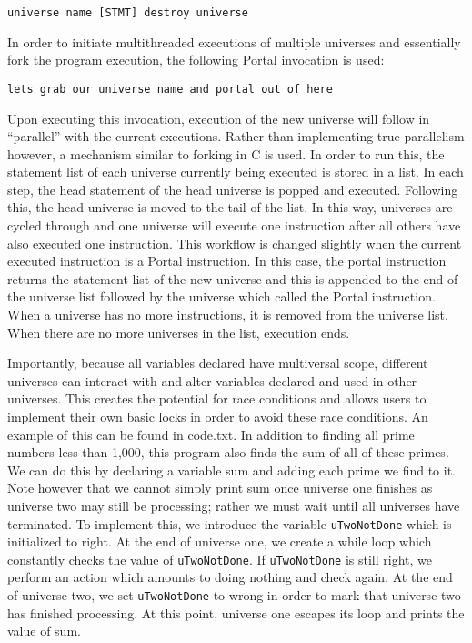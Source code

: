 \documentclass[preprint]{sigplanconf}
\begin{document}
\texttt{universe name [STMT] destroy universe}

	
In order to initiate multithreaded executions of multiple universes and essentially fork the program execution, the following Portal invocation is used:
	

\texttt{lets grab our universe name and portal out of here}

	
Upon executing this invocation, execution of the new universe will follow in “parallel” with the current executions. Rather than implementing true parallelism however, a mechanism similar to forking in C is used. In order to run this, the statement list of each universe currently being executed is stored in a list. In each step, the head statement of the head universe is popped and executed. Following this, the head universe is moved to the tail of the list. In this way, universes are cycled through and one universe will execute one instruction after all others have also executed one instruction. This workflow is changed slightly when the current executed instruction is a Portal instruction. In this case, the portal instruction returns the statement list of the new universe and this is appended to the end of the universe list followed by the universe which called the Portal instruction. When a universe has no more instructions, it is removed from the universe list. When there are no more universes in the list, execution ends.

Importantly, because all variables declared have multiversal scope, different universes can interact with and alter variables declared and used in other universes. This creates the potential for race conditions and allows users to implement their own basic locks in order to avoid these race conditions. An example of this can be found in code.txt. In addition to finding all prime numbers less than 1,000, this program also finds the sum of all of these primes. We can do this by declaring a variable sum and adding each prime we find to it. Note however that we cannot simply print sum once universe one finishes as universe two may still be processing; rather we must wait until all universes have terminated. To implement this, we introduce the variable \texttt{uTwoNotDone} which is initialized to right. At the end of universe one, we create a while loop which constantly checks the value of \texttt{uTwoNotDone}. If \texttt{uTwoNotDone} is still right, we perform an action which amounts to doing nothing and check again. At the end of universe two, we set \texttt{uTwoNotDone} to wrong in order to mark that universe two has finished processing. At this point, universe one escapes its loop and prints the value of sum.
\end{document}
